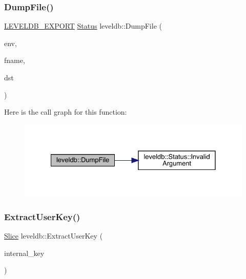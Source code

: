 \subsubsection{\texorpdfstring{DumpFile()}{DumpFile()}}
{\footnotesize\ttfamily \mbox{\hyperlink{export_8h_a658cd25b9dd114d894ae8ce9dddb7d3a}{L\+E\+V\+E\+L\+D\+B\+\_\+\+E\+X\+P\+O\+RT}} \mbox{\hyperlink{classleveldb_1_1_status}{Status}} leveldb\+::\+Dump\+File (\begin{DoxyParamCaption}\item[{\mbox{\hyperlink{classleveldb_1_1_env}{Env}} $\ast$}]{env,  }\item[{const std\+::string \&}]{fname,  }\item[{\mbox{\hyperlink{classleveldb_1_1_writable_file}{Writable\+File}} $\ast$}]{dst }\end{DoxyParamCaption})}

Here is the call graph for this function\+:
\nopagebreak
\begin{figure}[H]
\begin{center}
\leavevmode
\includegraphics[width=328pt]{namespaceleveldb_ad50cdd0c24cae7dc81faa1735725ddb9_cgraph}
\end{center}
\end{figure}
\mbox{\label{namespaceleveldb_a1c889869840312393b805ad91a41b94f}} 
\subsubsection{\texorpdfstring{ExtractUserKey()}{ExtractUserKey()}}
{\footnotesize\ttfamily \mbox{\hyperlink{classleveldb_1_1_slice}{Slice}} leveldb\+::\+Extract\+User\+Key (\begin{DoxyParamCaption}\item[{const \mbox{\hyperlink{classleveldb_1_1_slice}{Slice}} \&}]{internal\+\_\+key }\end{DoxyParamCaption})\hspace{0.3cm}{\ttfamily [inline]}}

